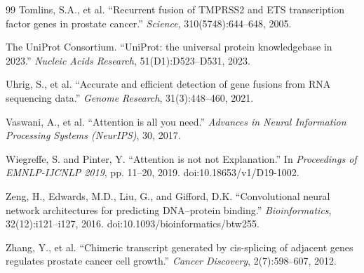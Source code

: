 \documentclass{bioinfo}
\begin{document}
\begin{thebibliography}{99}
Tomlins, S.A., et al. ``Recurrent fusion of TMPRSS2 and ETS transcription factor genes in prostate cancer.''
\textit{Science}, 310(5748):644--648, 2005.

The UniProt Consortium. ``UniProt: the universal protein knowledgebase in 2023.''
\textit{Nucleic Acids Research}, 51(D1):D523--D531, 2023.

Uhrig, S., et al. ``Accurate and efficient detection of gene fusions from RNA sequencing data.''
\textit{Genome Research}, 31(3):448--460, 2021.

Vaswani, A., et al. ``Attention is all you need.''
\textit{Advances in Neural Information Processing Systems (NeurIPS)}, 30, 2017.

Wiegreffe, S. and Pinter, Y. ``Attention is not not Explanation.''
In \textit{Proceedings of EMNLP-IJCNLP 2019}, pp. 11--20, 2019. doi:10.18653/v1/D19-1002.

Zeng, H., Edwards, M.D., Liu, G., and Gifford, D.K. ``Convolutional neural network architectures for predicting DNA--protein binding.''
\textit{Bioinformatics}, 32(12):i121--i127, 2016. doi:10.1093/bioinformatics/btw255.

Zhang, Y., et al. ``Chimeric transcript generated by cis-splicing of adjacent genes regulates prostate cancer cell growth.''
\textit{Cancer Discovery}, 2(7):598--607, 2012.

\end{thebibliography}
\end{document}
